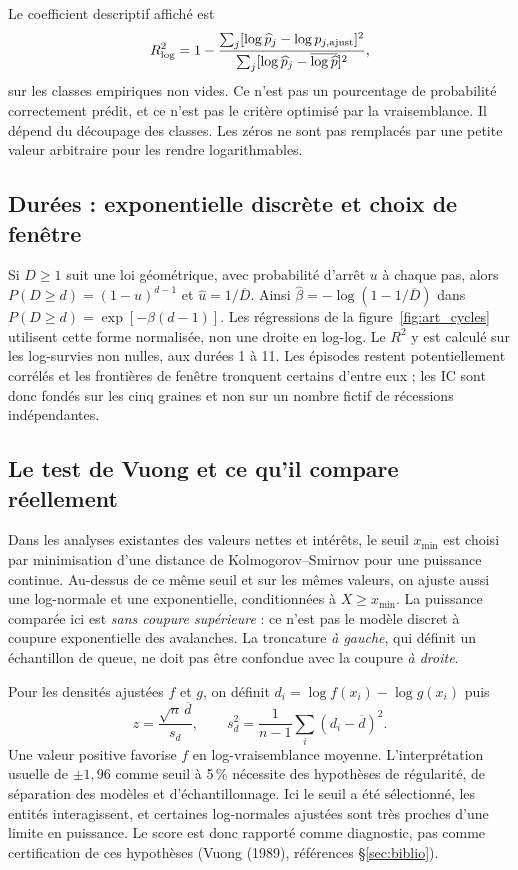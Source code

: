 Le coefficient descriptif affiché est
\[
 R^2_{\log}=1-
 \frac{\sum_j[\log\widehat p_j-\log p_{j,\rm ajust}]^2}
      {\sum_j[\log\widehat p_j-\overline{\log\widehat p}]^2},
\]
sur les classes empiriques non vides. Ce n'est pas un pourcentage
de probabilité correctement prédit, et ce n'est pas le critère
optimisé par la vraisemblance. Il dépend du découpage des classes.
Les zéros ne sont pas remplacés par une petite valeur arbitraire
pour les rendre logarithmables.

\subsection{Durées : exponentielle discrète et choix de fenêtre}
Si $D\ge1$ suit une loi géométrique, avec probabilité d'arrêt $u$ à
chaque pas, alors $P(D\ge d)=(1-u)^{d-1}$ et
$\widehat u=1/\overline D$. Ainsi
$\widehat\beta=-\log(1-1/\overline D)$ dans
$P(D\ge d)=\exp[-\beta(d-1)]$.
Les régressions de la figure~\ref{fig:art_cycles} utilisent cette
forme normalisée, non une droite en log-log. Le $R^2$ y est calculé
sur les log-survies non nulles, aux durées 1 à 11. Les épisodes restent
potentiellement corrélés et les frontières de fenêtre tronquent certains
d'entre eux ; les IC sont donc fondés sur les cinq graines et non sur
un nombre fictif de récessions indépendantes.

\subsection{Le test de Vuong et ce qu'il compare réellement}
Dans les analyses existantes des valeurs nettes et intérêts, le seuil
$x_{\min}$ est choisi par minimisation d'une distance de
Kolmogorov--Smirnov pour une puissance continue. Au-dessus de ce même
seuil et sur les mêmes valeurs, on ajuste aussi une log-normale et
une exponentielle, conditionnées à $X\ge x_{\min}$.
La puissance comparée ici est \emph{sans coupure supérieure} : ce
n'est pas le modèle discret à coupure exponentielle des avalanches.
La troncature \emph{à gauche}, qui définit un échantillon de queue,
ne doit pas être confondue avec la coupure \emph{à droite}.

Pour les densités ajustées $f$ et $g$, on définit
$d_i=\log f(x_i)-\log g(x_i)$ puis
\[
 z=\frac{\sqrt n\,\overline d}{s_d},\qquad
 s_d^2=\frac1{n-1}\sum_i(d_i-\overline d)^2.
\]
Une valeur positive favorise $f$ en log-vraisemblance moyenne.
L'interprétation usuelle de $\pm1{,}96$ comme seuil à 5\,\%
nécessite des hypothèses de régularité, de séparation des modèles
et d'échantillonnage. Ici le seuil a été sélectionné, les entités
interagissent, et certaines log-normales ajustées sont très proches
d'une limite en puissance. Le score est donc rapporté comme diagnostic,
pas comme certification de ces hypothèses (Vuong (1989), références §\ref{sec:biblio}).

